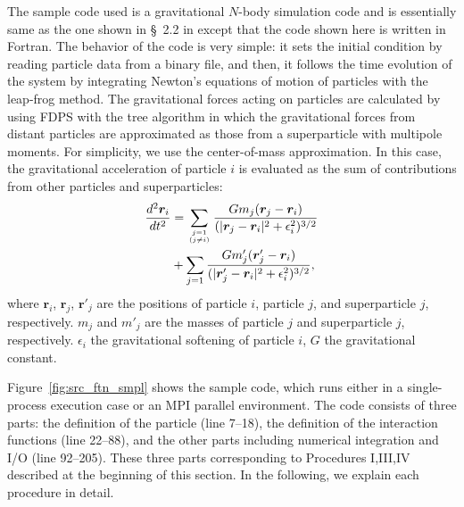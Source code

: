 \documentclass[proof,useamsfonts]{pasj01}
\newcommand{\diff}{{\mathrm d}}
\begin{document}
The sample code used is a gravitational $N$-body simulation code and is essentially same as the one shown in \S~2.2 in \citet{iwasawa16:_implem_fdps} except that the code shown here is written in Fortran. The behavior of the code is very simple: it sets the initial condition by reading particle data from a binary file, and then, it follows the time evolution of the system by integrating Newton's equations of motion of particles with the leap-frog method. The gravitational forces acting on particles are calculated by using FDPS with the tree algorithm in which the gravitational forces from distant particles are approximated as those from a superparticle with multipole moments. For simplicity, we use the center-of-mass approximation. In this case, the gravitational acceleration of particle $i$ is evaluated as the sum of contributions from other particles and superparticles:
\begin{eqnarray}
\frac{\diff^{2}\bm{r}_{i}}{\diff t^{2}} & = \sum_{j=1 \atop (j\neq i)}\frac{Gm_{j}(\bm{r}_{j}-\bm{r}_{i})}{(|\bm{r}_{j}-\bm{r}_{i}|^{2}+\epsilon^{2}_{i})^{3/2}} \nonumber\\
& +\sum_{j=1}\frac{G m'_{j}(\bm{r}'_{j}-\bm{r}_{i})}{(|\bm{r}'_{j}-\bm{r}_{i}|^{2}+\epsilon^{2}_{i})^{3/2}}, \label{eq:nbody_EoM_tree}
\end{eqnarray}
where $\bm{r}_{i}$, $\bm{r}_{j}$, $\bm{r}'_{j}$ are the positions of particle $i$,  particle $j$, and superparticle $j$, respectively. $m_{j}$ and $m'_{j}$ are the masses of particle $j$ and superparticle $j$, respectively. $\epsilon_{i}$ the gravitational softening of particle $i$, $G$ the gravitational constant. 


Figure~\ref{fig:src_ftn_smpl} shows the sample code, which runs either in a single-process execution case or an MPI parallel environment. The code consists of three parts: the definition of the particle (line 7--18), the definition of the interaction functions (line 22--88), and the other parts including numerical integration and I/O (line 92--205). These three parts corresponding to Procedures I,III,IV described at the beginning of this section. In the following, we explain each procedure in detail.
\end{document}
